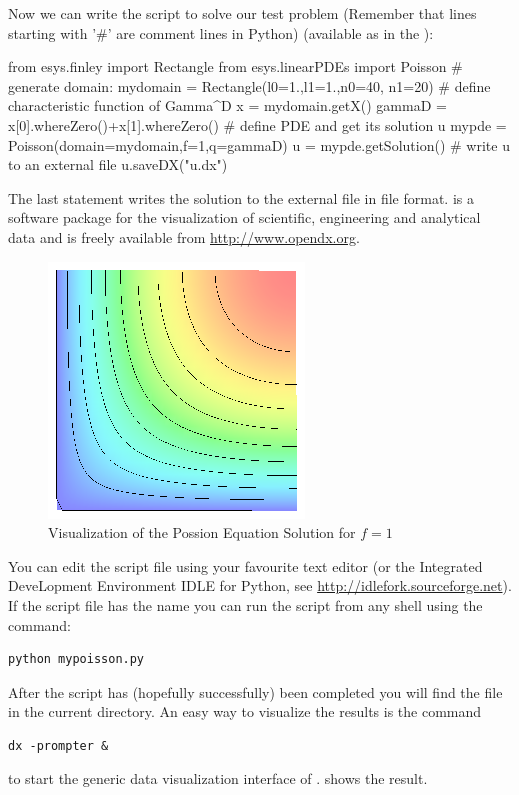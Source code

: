 Now we can write the script to solve our test problem (Remember that
lines starting with '\#' are comment lines in Python) (available as  
in the \ExampleDirectory):
\begin{python}
from esys.finley import Rectangle
from esys.linearPDEs import Poisson
# generate domain:
mydomain = Rectangle(l0=1.,l1=1.,n0=40, n1=20)
# define characteristic function of Gamma^D
x = mydomain.getX()
gammaD = x[0].whereZero()+x[1].whereZero()
# define PDE and get its solution u
mypde = Poisson(domain=mydomain,f=1,q=gammaD)
u = mypde.getSolution()
# write u to an external file
u.saveDX("u.dx")
\end{python}
The last statement writes the solution to the external file  in 
\OpenDX file format. \OpenDX is a software package
for the visualization of scientific, engineering and analytical data and is freely available
from \url{http://www.opendx.org}.

\begin{figure}
\centerline{\includegraphics[width=\figwidth]{FirstStepResult.eps}}
\caption{\OpenDX Visualization of the Possion Equation Solution for $f=1$}
\label{fig:FirstSteps.3}
\end{figure}

You can edit the script file using your favourite text editor (or the Integrated DeveLopment Environment IDLE
for Python, see \url{http://idlefork.sourceforge.net}). If the script file has the name   you can run the
script from any shell using the command:
\begin{verbatim} 
python mypoisson.py
\end{verbatim}
After the script has (hopefully successfully) been completed you will find the file  in the current
directory. An easy way to visualize the results is the command
\begin{verbatim} 
dx -prompter &
\end{verbatim}
to start the generic data visualization interface of \OpenDX.  shows the result.
